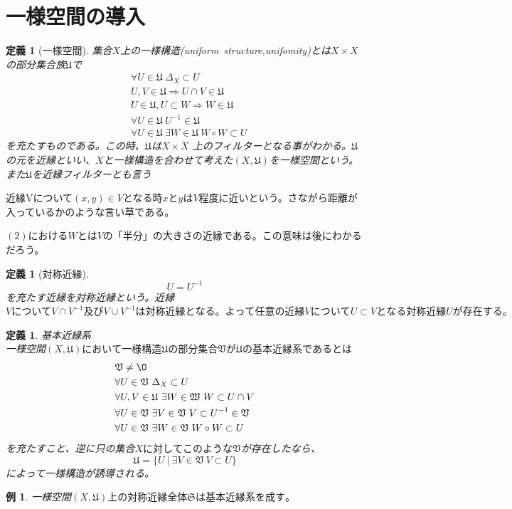 \documentclass[leqno]{jsarticle}
\newtheorem{df}[thm]{定義}
\newtheorem{exam}[thm]{例}
\begin{document}
\section{一様空間の導入}
\begin{df}[一様空間]
集合$X$上の一様構造(uniform\ structure,unifomity)とは$X \times X$の部分集合族$\mathfrak{U}$で
\begin{align*}
&\forall U\in \mathfrak{U}\ \Delta_{X} \subset U\\
&U,V\in \mathfrak{U}\Rightarrow U\cap V\in \mathfrak{U}\\
&U\in \mathfrak{U},U\subset W\Rightarrow W\in \mathfrak{U}\\
&\forall U\in \mathfrak{U}\ U^{-1}\in \mathfrak{U}\\
&\forall U \in \mathfrak{U}\  \exists W\in \mathfrak{U}\  W\circ W\subset U
\end{align*}
を充たすものである。この時、$\mathfrak{U}$は$X\times X$
上のフィルターとなる事がわかる。$\mathfrak{U}$の元を近縁といい、$X$と一様構造を合わせて考えた$(X,\mathfrak{U})$を一様空間という。また$\mathfrak{U}$を近縁フィルターとも言う
\end{df}
近縁Vについて$(x,y)\in V$となる時$x$と$y$は$V$程度に近いという。さながら距離が入っているかのような言い草である。\par
$(2)$における$W$とは$V$の「半分」の大きさの近縁である。この意味は後にわかるだろう。
\begin{df}[対称近縁]
\[
U=U^{-1}
\]を充たす近縁を対称近縁という。近縁$VについてV\cap V^{-1}及びV\cup V^{-1}は対称近縁となる。よって任意の近縁VについてU\subset Vとなる対称近縁Uが存在する。$
\end{df}
\begin{df}基本近縁系\\
一様空間$(X,\mathfrak{U})において一様構造\mathfrak{U}の部分集合\mathfrak{V}が\mathfrak{U}の基本近縁系であるとは$
\begin{align*}
&\mathfrak{V}\neq \O\\
&\forall U\in \mathfrak{V}\ \Delta_{X} \subset U\\
&\forall U,V\in \mathfrak{U}\ \exists W\in \mathfrak{W} \ W\subset U\cap V\\
&\forall U\in \mathfrak{V}\ \exists V\in \mathfrak{V}\ V\subset U^{-1}\in \mathfrak{V}\\
&\forall U \in \mathfrak{V}\  \exists W\in \mathfrak{V}\  W\circ W\subset U
\end{align*}を充たすこと、逆に只の集合$Xに対してこのような\mathfrak{V}$が存在したなら、
\[
\mathfrak{U}=\{U\ |\ \exists V\in \mathfrak{V}\ V\subset U\}
\]によって一様構造が誘導される。
\end{df}
\begin{exam}一様空間$(X,\mathfrak{U})上の対称近縁全体\mathfrak{S}は基本近縁系を成す。$
\end{exam}
\end{document}
